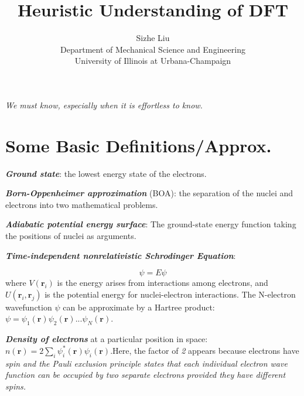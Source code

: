 \documentclass[12pt]{article}
\begin{document}
\title{Heuristic Understanding of DFT}
\author{Sizhe Liu\\Department of Mechanical Science and Engineering \\University of Illinois at Urbana-Champaign\\ } 
\begin{titlingpage}
\maketitle
\end{titlingpage}

\newpage
\tableofcontents
\newpage
\vspace*{100pt}
\textit{We must know, especially when it is effortless to know.}
\newpage

\section{Some Basic Definitions/Approx.}
\textbf{\textit{Ground state}}: the lowest energy state of the electrons.

\textbf{\textit{Born-Oppenheimer approximation}} (BOA): the separation of the nuclei and electrons into two mathematical problems.

\textbf{\textit{Adiabatic potential energy surface}}: The ground-state energy function taking the positions of nuclei as arguments.

\textbf{\textit{Time-independent nonrelativistic Schrodinger Equation}}:

\begin{equation}
    [-\frac{\hbar^2}{2m}\sum^N_{i=1}\nabla^2_i+\sum^N_{i=1}V(\boldsymbol{r}_i)+\sum_{i=1}^N\sum_{j<i}U(\boldsymbol{r}_i, \boldsymbol{r}_j)]\psi = E\psi
\end{equation}
where $V(\boldsymbol{r}_i)$ is the energy arises from interactions among electrons, and $U(\boldsymbol{r}_i, \boldsymbol{r}_j)$ is the potential energy for nuclei-electron interactions. The N-electron wavefunction $\psi$ can be approximate by a Hartree product:$\psi=\psi_1(\boldsymbol{r})\psi_2(\boldsymbol{r})...\psi_N(\boldsymbol{r})$.

\textbf{\textit{Density of electrons}} at a particular position in space:  $n(\boldsymbol{r})=2\sum_i\psi^*_i(\boldsymbol{r})\psi_i(\boldsymbol{r})$.Here, the factor of \textit{2} appears because electrons have \textit{spin and the Pauli exclusion principle states that each individual electron wave function can be occupied by two separate electrons provided they have different spins.}
\end{document}
